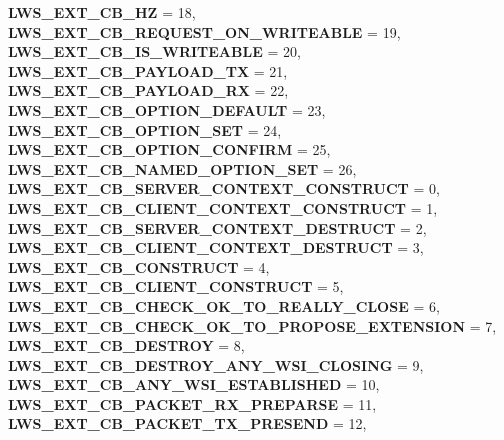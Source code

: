 \begin{DoxyCompactItemize}
{\bfseries L\+W\+S\+\_\+\+E\+X\+T\+\_\+\+C\+B\+\_\+HZ} = 18, 
{\bfseries L\+W\+S\+\_\+\+E\+X\+T\+\_\+\+C\+B\+\_\+\+R\+E\+Q\+U\+E\+S\+T\+\_\+\+O\+N\+\_\+\+W\+R\+I\+T\+E\+A\+B\+LE} = 19, 
{\bfseries L\+W\+S\+\_\+\+E\+X\+T\+\_\+\+C\+B\+\_\+\+I\+S\+\_\+\+W\+R\+I\+T\+E\+A\+B\+LE} = 20, 
\newline
{\bfseries L\+W\+S\+\_\+\+E\+X\+T\+\_\+\+C\+B\+\_\+\+P\+A\+Y\+L\+O\+A\+D\+\_\+\+TX} = 21, 
{\bfseries L\+W\+S\+\_\+\+E\+X\+T\+\_\+\+C\+B\+\_\+\+P\+A\+Y\+L\+O\+A\+D\+\_\+\+RX} = 22, 
{\bfseries L\+W\+S\+\_\+\+E\+X\+T\+\_\+\+C\+B\+\_\+\+O\+P\+T\+I\+O\+N\+\_\+\+D\+E\+F\+A\+U\+LT} = 23, 
{\bfseries L\+W\+S\+\_\+\+E\+X\+T\+\_\+\+C\+B\+\_\+\+O\+P\+T\+I\+O\+N\+\_\+\+S\+ET} = 24, 
\newline
{\bfseries L\+W\+S\+\_\+\+E\+X\+T\+\_\+\+C\+B\+\_\+\+O\+P\+T\+I\+O\+N\+\_\+\+C\+O\+N\+F\+I\+RM} = 25, 
{\bfseries L\+W\+S\+\_\+\+E\+X\+T\+\_\+\+C\+B\+\_\+\+N\+A\+M\+E\+D\+\_\+\+O\+P\+T\+I\+O\+N\+\_\+\+S\+ET} = 26, 
{\bfseries L\+W\+S\+\_\+\+E\+X\+T\+\_\+\+C\+B\+\_\+\+S\+E\+R\+V\+E\+R\+\_\+\+C\+O\+N\+T\+E\+X\+T\+\_\+\+C\+O\+N\+S\+T\+R\+U\+CT} = 0, 
{\bfseries L\+W\+S\+\_\+\+E\+X\+T\+\_\+\+C\+B\+\_\+\+C\+L\+I\+E\+N\+T\+\_\+\+C\+O\+N\+T\+E\+X\+T\+\_\+\+C\+O\+N\+S\+T\+R\+U\+CT} = 1, 
\newline
{\bfseries L\+W\+S\+\_\+\+E\+X\+T\+\_\+\+C\+B\+\_\+\+S\+E\+R\+V\+E\+R\+\_\+\+C\+O\+N\+T\+E\+X\+T\+\_\+\+D\+E\+S\+T\+R\+U\+CT} = 2, 
{\bfseries L\+W\+S\+\_\+\+E\+X\+T\+\_\+\+C\+B\+\_\+\+C\+L\+I\+E\+N\+T\+\_\+\+C\+O\+N\+T\+E\+X\+T\+\_\+\+D\+E\+S\+T\+R\+U\+CT} = 3, 
{\bfseries L\+W\+S\+\_\+\+E\+X\+T\+\_\+\+C\+B\+\_\+\+C\+O\+N\+S\+T\+R\+U\+CT} = 4, 
{\bfseries L\+W\+S\+\_\+\+E\+X\+T\+\_\+\+C\+B\+\_\+\+C\+L\+I\+E\+N\+T\+\_\+\+C\+O\+N\+S\+T\+R\+U\+CT} = 5, 
\newline
{\bfseries L\+W\+S\+\_\+\+E\+X\+T\+\_\+\+C\+B\+\_\+\+C\+H\+E\+C\+K\+\_\+\+O\+K\+\_\+\+T\+O\+\_\+\+R\+E\+A\+L\+L\+Y\+\_\+\+C\+L\+O\+SE} = 6, 
{\bfseries L\+W\+S\+\_\+\+E\+X\+T\+\_\+\+C\+B\+\_\+\+C\+H\+E\+C\+K\+\_\+\+O\+K\+\_\+\+T\+O\+\_\+\+P\+R\+O\+P\+O\+S\+E\+\_\+\+E\+X\+T\+E\+N\+S\+I\+ON} = 7, 
{\bfseries L\+W\+S\+\_\+\+E\+X\+T\+\_\+\+C\+B\+\_\+\+D\+E\+S\+T\+R\+OY} = 8, 
{\bfseries L\+W\+S\+\_\+\+E\+X\+T\+\_\+\+C\+B\+\_\+\+D\+E\+S\+T\+R\+O\+Y\+\_\+\+A\+N\+Y\+\_\+\+W\+S\+I\+\_\+\+C\+L\+O\+S\+I\+NG} = 9, 
\newline
{\bfseries L\+W\+S\+\_\+\+E\+X\+T\+\_\+\+C\+B\+\_\+\+A\+N\+Y\+\_\+\+W\+S\+I\+\_\+\+E\+S\+T\+A\+B\+L\+I\+S\+H\+ED} = 10, 
{\bfseries L\+W\+S\+\_\+\+E\+X\+T\+\_\+\+C\+B\+\_\+\+P\+A\+C\+K\+E\+T\+\_\+\+R\+X\+\_\+\+P\+R\+E\+P\+A\+R\+SE} = 11, 
{\bfseries L\+W\+S\+\_\+\+E\+X\+T\+\_\+\+C\+B\+\_\+\+P\+A\+C\+K\+E\+T\+\_\+\+T\+X\+\_\+\+P\+R\+E\+S\+E\+ND} = 12, 

\end{DoxyCompactItemize}
